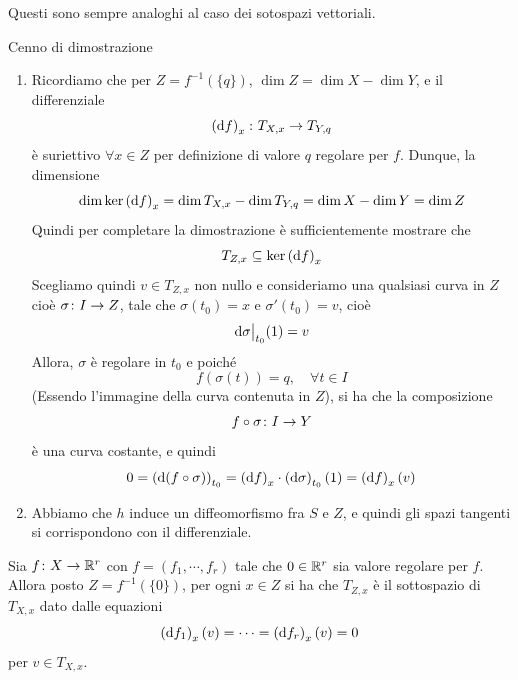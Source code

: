 \documentclass[a4paper]{article}
\begin{document}
Questi sono sempre analoghi al caso dei sotospazi vettoriali.

\begin{snippetproof}{Cenno di dimostrazione}
    \begin{enumerate}
        \item Ricordiamo che per \(Z = f^{-1}(\{q\})\),
        \(\dim Z = \dim X - \dim Y\), e il differenziale \[
            \left(
                \text df
            \right)_x \colon T_{X,x} \to T_{Y,q}
        \]
        è suriettivo \(\forall x \in Z\) per definizione di valore \(q\)
        regolare per \(f\). Dunque, la dimensione
        \[
            \dim \ker\left(\text df\right)_x = \dim T_{X,x} - \dim T_{Y,q}
            = \dim X - \dim Y = \dim Z
        \]
        Quindi per completare la dimostrazione è sufficientemente mostrare che
        \[
            T_{Z,x} \subseteq \ker \left(\text df\right)_x
        \]
        Scegliamo quindi \(v \in T_{Z,x}\) non nullo e consideriamo
        una qualsiasi curva in \(Z\) cioè
        \(\sigma \colon I \to Z\), tale che
        \(\sigma(t_0) = x\) e \(\sigma'(t_0) = v\), cioè
        \[
            \restr{\text d\sigma}{t_0}(1) = v
        \]
        Allora, \(\sigma\) è regolare in \(t_0\)
        e poiché
        \[
            f(\sigma(t)) = q, \quad \forall t \in I
        \]
        (Essendo l'immagine della curva contenuta in \(Z\)), si ha che la composizione
        \[
            f \circ \sigma \colon I \to Y
        \]
        è una curva costante, e quindi \[
             0 = \left(\text d(f \circ \sigma)\right)_{t_0}
             = \left(\text df\right)_x \cdot
             \left(\text d\sigma \right)_{t_0}(1)
             = \left(\text df\right)_x (v)
        \]
        \item Abbiamo che \(h\) induce un diffeomorfismo fra \(S\) e \(Z\),
        e quindi gli spazi tangenti si corrispondono con il differenziale.
    \end{enumerate}
\end{snippetproof}

\begin{snippetcorollary}{}
    Sia \(f \colon X \to \mathbb{R}^r\)
    con \(f = (f_1, \cdots, f_r)\)
    tale che \(0 \in \mathbb{R}^r\) sia valore regolare per \(f\).
    Allora posto \(Z = f^{-1}(\{0\})\), per ogni \(x \in Z\)
    si ha che \(T_{Z,x}\) è il sottospazio di \(T_{X,x}\)
    dato dalle equazioni
    \[
        \left(\text df_1\right)_x(v)
        = \cdots =
        \left(\text df_r\right)_x(v) = 0
    \]
    per \(v\in T_{X,x}\).
\end{snippetcorollary}
\end{document}

